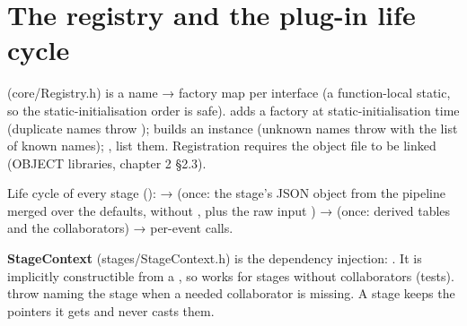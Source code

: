 \section{\texorpdfstring{The registry and the plug-in life cycle}{The registry and the plug-in life cycle}}\label{developer_manual-03u5farchitecture:32-the-registry-and-the-plug-in-life-cycle}
 (core/\allowbreak{}Registry.\allowbreak{}h) is a name → factory map per interface (a function-local static, so the
static-initialisation order is safe).  adds a factory at static-initialisation time
(duplicate names throw );  builds an instance (unknown names throw
 with the list of known names); ,  list them. Registration requires the object
file to be linked (OBJECT libraries, chapter 2 §2.3).

Life cycle of every stage ():  →  (once: the stage's JSON object from the
pipeline merged over the defaults, without , plus the raw input ) →  (once:
derived tables and the collaborators) → per-event calls.

\textbf{StageContext} (stages/\allowbreak{}StageContext.\allowbreak{}h) is the dependency injection: . It is implicitly constructible from a , so 
works for stages without collaborators (tests).  throw
 naming the stage when a needed collaborator is missing. A stage keeps the pointers it gets and never
casts them.

